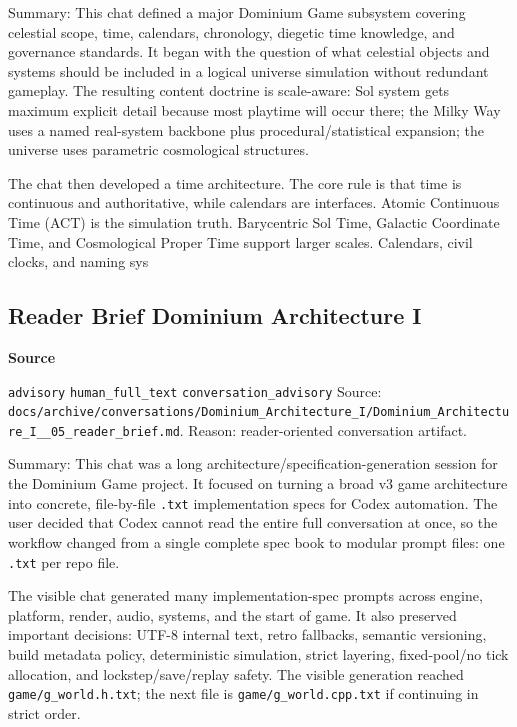 \documentclass[9pt,a4paper,openany]{book}
\newcommand{\vonecallout}[3]{\par\medskip\noindent\begingroup\setlength{\fboxsep}{7pt}\colorbox{DomCalloutBg}{\parbox{0.94\linewidth}{\textbf{\textcolor{#1}{#2}}\par #3}}\endgroup\par\medskip}
\begin{document}
Summary: This chat defined a major Dominium Game subsystem covering celestial scope, time, calendars, chronology, diegetic time knowledge, and governance standards.\allowbreak{} It began with the question of what celestial objects and systems should be included in a logical universe simulation without redundant gameplay.\allowbreak{} The resulting content doctrine is scale-\allowbreak{}aware: Sol system gets maximum explicit detail because most playtime will occur there; the Milky Way uses a named real-\allowbreak{}system backbone plus procedural/\allowbreak{}statistical expansion; the universe uses parametric cosmological structures.\allowbreak{}


The chat then developed a time architecture.\allowbreak{} The core rule is that time is continuous and authoritative, while calendars are interfaces.\allowbreak{} Atomic Continuous Time (ACT) is the simulation truth.\allowbreak{} Barycentric Sol Time, Galactic Coordinate Time, and Cosmological Proper Time support larger scales.\allowbreak{} Calendars, civil clocks, and naming sys



\subsection{Reader Brief Dominium Architecture I}

\vonecallout{DomSlate}{Source}{\texttt{advisory} \texttt{human\_\allowbreak{}full\_\allowbreak{}text} \texttt{conversation\_\allowbreak{}advisory} Source: \texttt{docs/\allowbreak{}archive/\allowbreak{}conversations/\allowbreak{}Dominium\_\allowbreak{}Architecture\_\allowbreak{}I/\allowbreak{}Dominium\_\allowbreak{}Architecture\_\allowbreak{}I\_\allowbreak{}\_\allowbreak{}05\_\allowbreak{}reader\_\allowbreak{}brief.\allowbreak{}md}.\allowbreak{} Reason: reader-\allowbreak{}oriented conversation artifact.\allowbreak{}}

Summary: This chat was a long architecture/\allowbreak{}specification-\allowbreak{}generation session for the Dominium Game project.\allowbreak{} It focused on turning a broad v3 game architecture into concrete, file-\allowbreak{}by-\allowbreak{}file \texttt{.\allowbreak{}txt} implementation specs for Codex automation.\allowbreak{} The user decided that Codex cannot read the entire full conversation at once, so the workflow changed from a single complete spec book to modular prompt files: one \texttt{.\allowbreak{}txt} per repo file.\allowbreak{}


The visible chat generated many implementation-\allowbreak{}spec prompts across engine, platform, render, audio, systems, and the start of game.\allowbreak{} It also preserved important decisions: UTF-\allowbreak{}8 internal text, retro fallbacks, semantic versioning, build metadata policy, deterministic simulation, strict layering, fixed-\allowbreak{}pool/\allowbreak{}no tick allocation, and lockstep/\allowbreak{}save/\allowbreak{}replay safety.\allowbreak{} The visible generation reached \texttt{game/\allowbreak{}g\_\allowbreak{}world.\allowbreak{}h.\allowbreak{}txt}; the next file is \texttt{game/\allowbreak{}g\_\allowbreak{}world.\allowbreak{}cpp.\allowbreak{}txt} if continuing in strict order.\allowbreak{}
\end{document}
